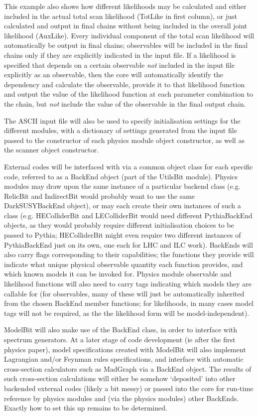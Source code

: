 This example also shows how different likelihoods may be calculated and either included in the actual total scan likelihood (TotLike in first column), or just calculated and output in final chains without being included in the overall joint likelihood (AuxLike).  Every individual component of the total scan likelihood will automatically be output in final chains; observables will be included in the final chains only if they are explicitly indicated in the input file.  If a likelihood is specified that depends on a certain observable \textit{not} included in the input file explicitly as an observable, then the core will automatically identify the dependency and calculate the observable, provide it to that likelihood function and output the value of the likelihood function at each parameter combination to the chain, but \textit{not} include the value of the observable in the final output chain.

The ASCII input file will also be used to specify initialisation settings for the different modules, with a dictionary of settings generated from the input file passed to the constructor of each physics module object constructor, as well as the scanner object constructor.

External codes will be interfaced with via a common object class for each specific code, referred to as a BackEnd object (part of the UtilsBit module).  Physics modules may draw upon the same instance of a particular backend class (e.g. RelicBit and IndirectBit would probably want to use the same DarkSUSYBackEnd object), or may each create their own instances of such a class (e.g. HEColliderBit and LEColliderBit would need different PythiaBackEnd objects, as they would probably require different initialisation choices to be passed to Pythia; HEColliderBit might even require two different instances of PythiaBackEnd just on its own, one each for LHC and ILC work).  BackEnds will also carry flags corresponding to their capabilities; the functions they provide will indicate what unique physical observable quantity each function provides, and which known models it can be invoked for.  Physics module observable and likelihood functions will also need to carry tags indicating which models they are callable for (for observables, many of these will just be automatically inherited from the chosen BackEnd member functions; for likelihoods, in many cases model tags will not be required, as the the likelihood form will be model-independent).

ModelBit will also make use of the BackEnd class, in order to interface with spectrum generators.  At a later stage of code development (ie after the first physics paper), model specifications created with ModelBit will also implement Lagrangian and/or Feynman rules specifications, and interface with automatic cross-section calculators such as MadGraph via a BackEnd object.  The results of such cross-section calculations will either be somehow `deposited' into other backended external codes (likely a bit messy) or passed into the core for run-time reference by physics modules and (via the physics modules) other BackEnds.  Exactly how to set this up remains to be determined.

